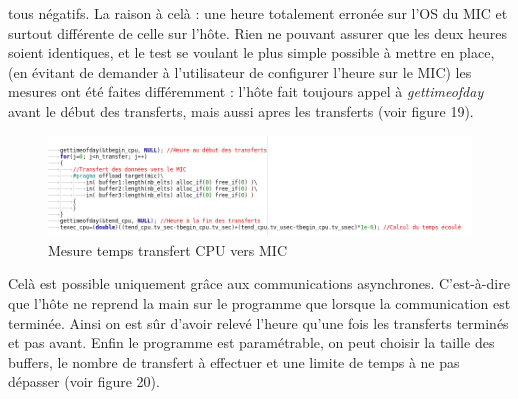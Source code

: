 \documentclass{article}
\begin{document}
					tous négatifs. La raison à celà : une heure totalement erronée sur l'OS du MIC et surtout différente de celle 
					sur l'hôte. Rien ne pouvant assurer que les deux heures soient identiques, et le test se voulant le plus 
					simple possible à mettre en place, (en évitant de demander à l'utilisateur de configurer l'heure sur le MIC) 
					les mesures ont été faites différemment : \newline
					l'hôte fait toujours appel à \emph{gettimeofday} avant le début des transferts, mais aussi apres les 
					transferts (voir figure 19).
					\begin{figure}
					\begin{center}
					\includegraphics[scale=0.5]{code.png}
					\caption{Mesure temps transfert CPU vers MIC}
					\end{center}
					\end{figure}
					Celà est possible uniquement grâce aux communications asynchrones. C'est-à-dire que l'hôte ne reprend la main 
					sur le programme que lorsque la communication est terminée. Ainsi on est sûr d'avoir relevé l'heure qu'une 
					fois les transferts terminés et pas avant. Enfin le programme est paramétrable, on peut choisir la taille 
					des buffers, le nombre de transfert à effectuer et une limite de temps à ne pas dépasser (voir figure 20).
\end{document}
